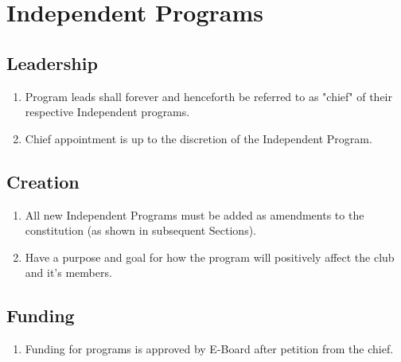 
\section{Independent Programs}

\subsection{Leadership}

\begin{enumerate}
  \item Program leads shall forever and henceforth be referred to as "chief" of
    their respective Independent programs.
  \item Chief appointment is up to the discretion of the Independent Program.
\end{enumerate}

\subsection{Creation}

\begin{enumerate}
  \item All new Independent Programs must be added as amendments to the
    constitution (as shown in subsequent Sections).
  \item Have a purpose and goal for how the program will positively affect the
    club and it’s members.
\end{enumerate}

\subsection{Funding}

\begin{enumerate}
  \item Funding for programs is approved by E-Board after petition from the
    chief.
\end{enumerate}




